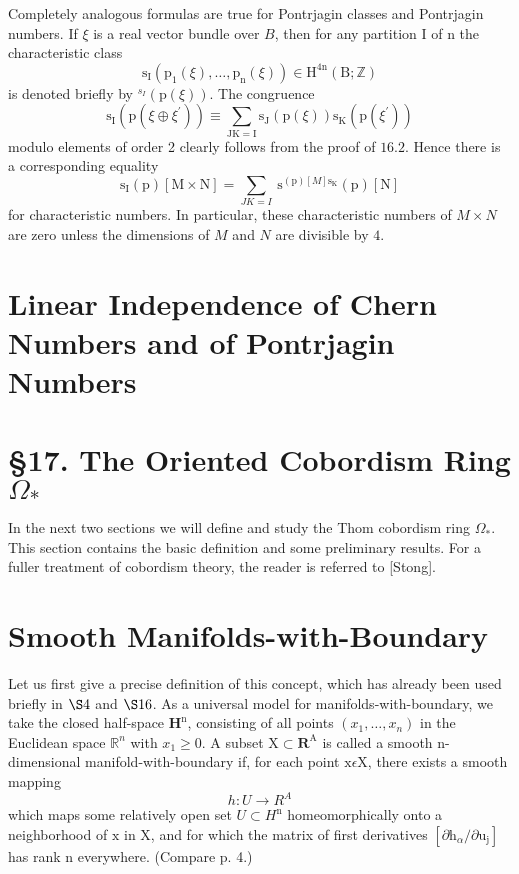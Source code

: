\documentclass[10pt]{article}
\begin{document}
Completely analogous formulas are true for Pontrjagin classes and Pontrjagin numbers. If $\xi$ is a real vector bundle over $B$, then for any partition I of $\mathrm{n}$ the characteristic class
$$
\mathrm{s}_{\mathrm{I}}\left(\mathrm{p}_{1}(\xi), \ldots, \mathrm{p}_{\mathrm{n}}(\xi)\right) \in \mathrm{H}^{4 \mathrm{n}}(\mathrm{B} ; \mathbb{Z})
$$
is denoted briefly by ${ }^{s_{I}}(\mathrm{p}(\xi))$. The congruence
$$
\mathrm{s}_{\mathrm{I}}\left(\mathrm{p}\left(\xi \oplus \xi^{\prime}\right)\right) \equiv \sum_{\mathrm{JK}=\mathrm{I}} \mathrm{s}_{\mathrm{J}}(\mathrm{p}(\xi)) \mathrm{s}_{\mathrm{K}}\left(\mathrm{p}\left(\xi^{\prime}\right)\right)
$$
modulo elements of order 2 clearly follows from the proof of $16.2$. Hence there is a corresponding equality
$$
\mathrm{s}_{\mathrm{I}}(\mathrm{p})[\mathrm{M} \times \mathrm{N}]=\sum_{J K=I} \mathrm{~s}^{(\mathrm{p})[M] \mathrm{s}_{\mathrm{K}}}(\mathrm{p})[\mathrm{N}]
$$
for characteristic numbers. In particular, these characteristic numbers of $M \times N$ are zero unless the dimensions of $M$ and $N$ are divisible by $4 .$

\section{Linear Independence of Chern Numbers and of Pontrjagin Numbers}


\section{§17. The Oriented Cobordism Ring $\Omega_{*}$}
In the next two sections we will define and study the Thom cobordism ring $\Omega_{*}$. This section contains the basic definition and some preliminary results. For a fuller treatment of cobordism theory, the reader is referred to [Stong].

\section{Smooth Manifolds-with-Boundary}
Let us first give a precise definition of this concept, which has already been used briefly in $\S 4$ and $\S 16$. As a universal model for manifolds-with-boundary, we take the closed half-space $\mathbf{H}^{\mathrm{n}}$, consisting of all points $\left(x_{1}, \ldots, x_{n}\right)$ in the Euclidean space $\mathbb{R}^{n}$ with $x_{1} \geq 0$. A subset $\mathrm{X} \subset \mathbf{R}^{\mathrm{A}}$ is called a smooth $\mathrm{n}$-dimensional manifold-with-boundary if, for each point $\mathrm{x} \epsilon \mathrm{X}$, there exists a smooth mapping
$$
h: U \rightarrow R^{A}
$$
which maps some relatively open set $U \subset H^{\mathrm{n}}$ homeomorphically onto a neighborhood of $\mathrm{x}$ in $\mathrm{X}$, and for which the matrix of first derivatives $\left[\partial \mathrm{h}_{\alpha} / \partial \mathrm{u}_{\mathrm{j}}\right]$ has rank $\mathrm{n}$ everywhere. (Compare $\mathrm{p} .$ 4.)
\end{document}
